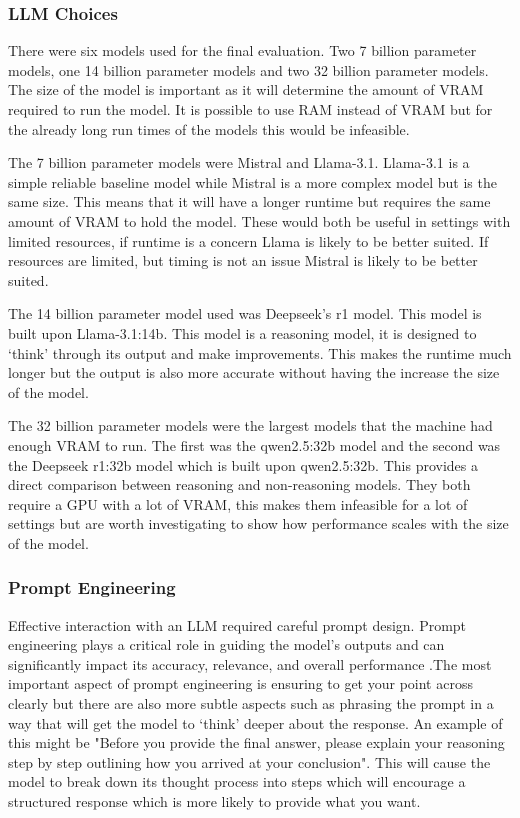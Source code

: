\documentclass[12pt]{extarticle}
\begin{document}
\subsubsection{LLM Choices}

There were six models used for the final evaluation. Two 7 billion parameter models, one 14 billion parameter models and two 32 billion parameter models. The size of the model is important as it will determine the amount of VRAM required to run the model. It is possible to use RAM instead of VRAM but for the already long run times of the models this would be infeasible.

The 7 billion parameter models were Mistral and Llama-3.1. Llama-3.1 is a simple reliable baseline model while Mistral is a more complex model but is the same size. This means that it will have a longer runtime but requires the same amount of VRAM to hold the model. These would both be useful in settings with limited resources, if runtime is a concern Llama is likely to be better suited. If resources are limited, but timing is not an issue Mistral is likely to be better suited.

The 14 billion parameter model used was Deepseek's r1 model. This model is built upon Llama-3.1:14b. This model is a reasoning model, it is designed to `think' through its output and make improvements. This makes the runtime much longer but the output is also more accurate without having the increase the size of the model.

The 32 billion parameter models were the largest models that the machine had enough VRAM to run. The first was the qwen2.5:32b model and the second was the Deepseek r1:32b model which is built upon qwen2.5:32b. This provides a direct comparison between reasoning and non-reasoning models. They both require a GPU with a lot of VRAM, this makes them infeasible for a lot of settings but are worth investigating to show how performance scales with the size of the model.

\subsubsection{Prompt Engineering}

Effective interaction with an LLM required careful prompt design. Prompt engineering plays a critical role in guiding the model's outputs and can significantly impact its accuracy, relevance, and overall performance .The most important aspect of prompt engineering is ensuring to get your point across clearly but there are also more subtle aspects such as phrasing the prompt in a way that will get the model to `think' deeper about the response. An example of this might be "Before you provide the final answer, please explain your reasoning step by step outlining how you arrived at your conclusion". This will cause the model to break down its thought process into steps which will encourage a structured response which is more likely to provide what you want. 
\end{document}
